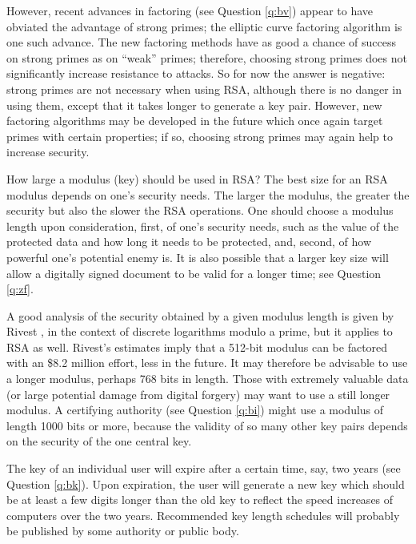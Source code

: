However, recent advances in factoring (see Question \ref {q:bv}) appear to 
have obviated the advantage of strong primes; the elliptic curve factoring 
algorithm is one such advance. The new factoring methods have as good a 
chance of success on strong primes as on ``weak'' primes; therefore, choosing 
strong primes does not significantly increase resistance to attacks. So for 
now the answer is negative: strong primes are not necessary when using RSA, 
although there is no danger in using them, except that it takes longer to 
generate a key pair. However, new factoring algorithms may be developed in 
the future which once again target primes with certain properties; if so, 
choosing strong primes may again help to increase security. 

{How large a modulus (key) should be used in RSA?}
The best size for an RSA modulus depends on one's security needs. The larger 
the modulus, the greater the security but also the slower the RSA operations. 
One should choose a modulus length upon consideration, first, of one's 
security needs, such as the value of the protected data and how long it needs 
to be protected, and, second, of how powerful one's potential enemy is. 
It is also possible that a larger key size will allow a digitally signed
document to be valid for a longer time; see Question \ref{q:zf}.

A good analysis of the security obtained by a given modulus length is given 
by Rivest \cite{rivest-dss-response}, in the context of discrete logarithms 
modulo a prime, but it applies to RSA as well. Rivest's estimates imply that 
a 512-bit modulus can be factored with an \$8.2 million effort, less in 
the future. It may therefore be advisable to use a longer modulus, perhaps 
768 bits in length. Those with extremely valuable data (or large potential 
damage from digital forgery) may want to use a still longer modulus. A 
certifying authority (see Question \ref{q:bi}) might use a modulus of length 
1000 bits or more, because the validity of so many other key pairs depends 
on the security of the one central key. 

The key of an individual user will expire after a certain time, say, two 
years (see Question \ref{q:bk}). Upon expiration, the user will generate a 
new key which should be at least a few digits longer than the old key to 
reflect the speed increases of computers over the two years. Recommended key 
length schedules will probably be published by some authority or public body. 


